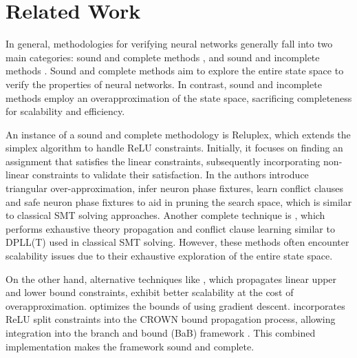 \section{Related Work}

In general, methodologies for verifying neural networks generally fall into two
main categories: sound and complete methods
\cite{reluplex,formal-ver-piece-wise,comp-reachability-analysis,comp-milp,comp-out-range,comp-max-resilience,marabou,comp-safety-ver-dnn,beta-crown,alpha-crown-bab-fnc,gcp-crown},
and sound and incomplete methods
\cite{deeppoly,crown,incomp-dual-approach,incomp-abs-inp,incomp-robustness-certi,incomp-boost-robustness}.
Sound and complete methods aim to explore the entire state space to verify the
properties of neural networks.
In contrast, sound and incomplete methods employ an overapproximation
of the state space, sacrificing completeness for 
scalability and efficiency.

An instance of a sound and complete methodology is Reluplex, which extends the 
simplex algorithm \cite{simplex} to 
handle ReLU constraints. Initially, it focuses on finding an assignment that 
satisfies the linear constraints, subsequently incorporating non-linear constraints 
to validate their satisfaction. In \cite{formal-ver-piece-wise}
the authors introduce triangular over-approximation, infer neuron phase fixtures,
learn conflict clauses and safe neuron phase fixtures to aid in pruning the search 
space, which is similar to classical SMT solving approaches. Another complete
technique is \neuralsat, which performs exhaustive theory propagation and
conflict clause learning similar to DPLL(T) used in classical SMT solving.
However, these methods often encounter scalability issues due to their
exhaustive exploration of the entire state space. 

On the other hand, alternative techniques like \cite{crown,deeppoly}, which
propagates linear upper and lower bound constraints, exhibit better
scalability at the cost of overapproximation. \cite{alpha-crown-bab-fnc} 
optimizes the bounds of \cite{crown} 
using gradient descent. 
\cite{beta-crown} incorporates ReLU split
constraints into the CROWN bound propagation process, allowing integration
into the branch and bound (BaB) framework
\cite{bab-fw,bab-piecewise-nn,bab-lagrangian-decomp}. 
This combined implementation makes the \abcrown framework sound and complete.

